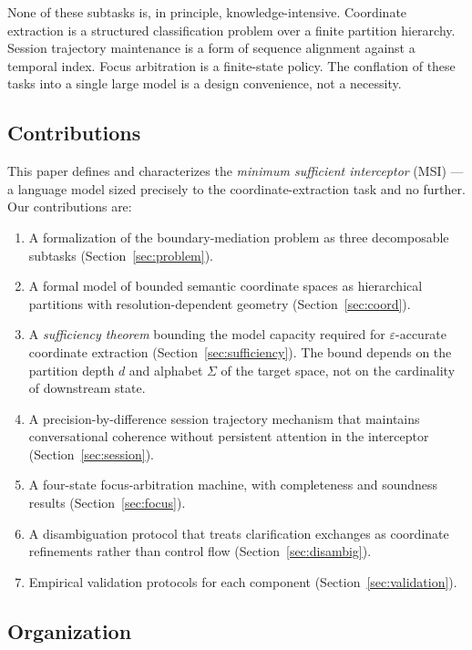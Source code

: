 \documentclass[11pt,twocolumn,a4paper]{article}
\theoremstyle{definition}
\theoremstyle{remark}
\begin{document}
None of these subtasks is, in principle, knowledge-intensive. Coordinate extraction is a structured classification problem over a finite partition hierarchy. Session trajectory maintenance is a form of sequence alignment against a temporal index. Focus arbitration is a finite-state policy. The conflation of these tasks into a single large model is a design convenience, not a necessity.

\subsection{Contributions}

This paper defines and characterizes the \emph{minimum sufficient interceptor} (MSI) --- a language model sized precisely to the coordinate-extraction task and no further. Our contributions are:

\begin{enumerate}
    \item A formalization of the boundary-mediation problem as three decomposable subtasks (Section~\ref{sec:problem}).
    \item A formal model of bounded semantic coordinate spaces as hierarchical partitions with resolution-dependent geometry (Section~\ref{sec:coord}).
    \item A \emph{sufficiency theorem} bounding the model capacity required for $\varepsilon$-accurate coordinate extraction (Section~\ref{sec:sufficiency}). The bound depends on the partition depth $d$ and alphabet $\Sigma$ of the target space, not on the cardinality of downstream state.
    \item A precision-by-difference session trajectory mechanism that maintains conversational coherence without persistent attention in the interceptor (Section~\ref{sec:session}).
    \item A four-state focus-arbitration machine, with completeness and soundness results (Section~\ref{sec:focus}).
    \item A disambiguation protocol that treats clarification exchanges as coordinate refinements rather than control flow (Section~\ref{sec:disambig}).
    \item Empirical validation protocols for each component (Section~\ref{sec:validation}).
\end{enumerate}

\subsection{Organization}
\end{document}
